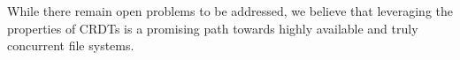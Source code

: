 \documentclass[sigconf,anonymous,10pt]{acmart}
\begin{document}
While there remain open problems to be addressed,
we believe that leveraging the properties of CRDTs is a promising path towards
highly available and truly concurrent file systems.
 








\end{document}
